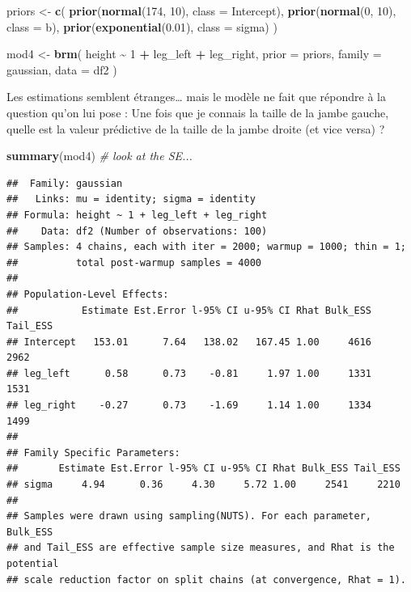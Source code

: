 \documentclass[
  a4paper,11pt,twoside,onecolumn,openright,final,oldfontcommands]{memoir}
\newenvironment{Shaded}{\begin{snugshade}}{\end{snugshade}}
\newcommand{\CommentTok}[1]{\textcolor[rgb]{0.56,0.35,0.01}{\textit{#1}}}
\newcommand{\DataTypeTok}[1]{\textcolor[rgb]{0.13,0.29,0.53}{#1}}
\newcommand{\DecValTok}[1]{\textcolor[rgb]{0.00,0.00,0.81}{#1}}
\newcommand{\FloatTok}[1]{\textcolor[rgb]{0.00,0.00,0.81}{#1}}
\newcommand{\KeywordTok}[1]{\textcolor[rgb]{0.13,0.29,0.53}{\textbf{#1}}}
\newcommand{\NormalTok}[1]{#1}
\newcommand{\OperatorTok}[1]{\textcolor[rgb]{0.81,0.36,0.00}{\textbf{#1}}}
\newcommand{\StringTok}[1]{\textcolor[rgb]{0.31,0.60,0.02}{#1}}
\theoremstyle{definition}
\theoremstyle{definition}
\theoremstyle{definition}
\theoremstyle{remark}
\begin{document}
\begin{Shaded}
\begin{Highlighting}[]
\NormalTok{priors \textless{}{-}}\StringTok{ }\KeywordTok{c}\NormalTok{(}
  \KeywordTok{prior}\NormalTok{(}\KeywordTok{normal}\NormalTok{(}\DecValTok{174}\NormalTok{, }\DecValTok{10}\NormalTok{), }\DataTypeTok{class =}\NormalTok{ Intercept),}
  \KeywordTok{prior}\NormalTok{(}\KeywordTok{normal}\NormalTok{(}\DecValTok{0}\NormalTok{, }\DecValTok{10}\NormalTok{), }\DataTypeTok{class =}\NormalTok{ b),}
  \KeywordTok{prior}\NormalTok{(}\KeywordTok{exponential}\NormalTok{(}\FloatTok{0.01}\NormalTok{), }\DataTypeTok{class =}\NormalTok{ sigma)}
\NormalTok{  )}

\NormalTok{mod4 \textless{}{-}}\StringTok{ }\KeywordTok{brm}\NormalTok{(}
\NormalTok{  height }\OperatorTok{\textasciitilde{}}\StringTok{ }\DecValTok{1} \OperatorTok{+}\StringTok{ }\NormalTok{leg\_left }\OperatorTok{+}\StringTok{ }\NormalTok{leg\_right,}
  \DataTypeTok{prior =}\NormalTok{ priors,}
  \DataTypeTok{family =}\NormalTok{ gaussian,}
  \DataTypeTok{data =}\NormalTok{ df2}
\NormalTok{  )}
\end{Highlighting}
\end{Shaded}

Les estimations semblent étranges\ldots{} mais le modèle ne fait que répondre à la question qu'on lui pose : Une fois que je connais la taille de la jambe gauche, quelle est la valeur prédictive de la taille de la jambe droite (et vice versa) ?

\begin{Shaded}
\begin{Highlighting}[]
\KeywordTok{summary}\NormalTok{(mod4) }\CommentTok{\# look at the SE...}
\end{Highlighting}
\end{Shaded}

\begin{verbatim}
##  Family: gaussian 
##   Links: mu = identity; sigma = identity 
## Formula: height ~ 1 + leg_left + leg_right 
##    Data: df2 (Number of observations: 100) 
## Samples: 4 chains, each with iter = 2000; warmup = 1000; thin = 1;
##          total post-warmup samples = 4000
## 
## Population-Level Effects: 
##           Estimate Est.Error l-95% CI u-95% CI Rhat Bulk_ESS Tail_ESS
## Intercept   153.01      7.64   138.02   167.45 1.00     4616     2962
## leg_left      0.58      0.73    -0.81     1.97 1.00     1331     1531
## leg_right    -0.27      0.73    -1.69     1.14 1.00     1334     1499
## 
## Family Specific Parameters: 
##       Estimate Est.Error l-95% CI u-95% CI Rhat Bulk_ESS Tail_ESS
## sigma     4.94      0.36     4.30     5.72 1.00     2541     2210
## 
## Samples were drawn using sampling(NUTS). For each parameter, Bulk_ESS
## and Tail_ESS are effective sample size measures, and Rhat is the potential
## scale reduction factor on split chains (at convergence, Rhat = 1).
\end{verbatim}
\end{document}
